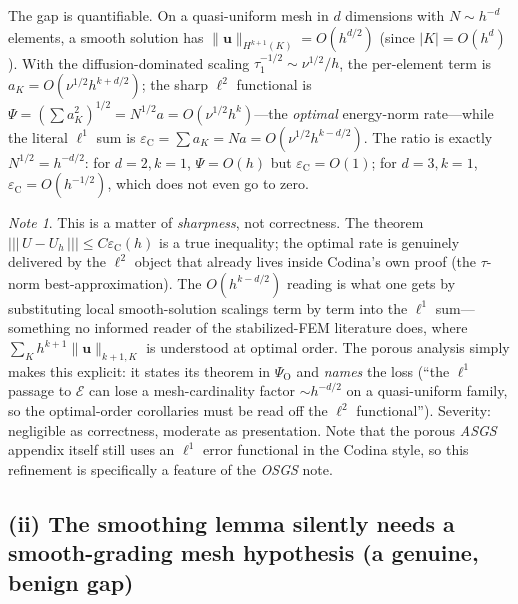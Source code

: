 \documentclass[11pt]{article}
\theoremstyle{remark}
\newtheorem*{note}{Note}
\newcommand{\bu}{\boldsymbol{u}}
\newcommand{\norm}[1]{\lVert #1 \rVert}
\newcommand{\tnorm}[1]{\lvert\!\lvert\!\lvert\, #1 \,\rvert\!\rvert\!\rvert}
\begin{document}
The gap is quantifiable. On a quasi-uniform mesh in $d$ dimensions with $N\sim h^{-d}$
elements, a smooth solution has $\norm{\bu}_{H^{k+1}(K)}=O(h^{d/2})$ (since $|K|=O(h^d)$).
With the diffusion-dominated scaling $\tau_1^{-1/2}\sim\nu^{1/2}/h$, the per-element term is
$a_K=O(\nu^{1/2}h^{k+d/2})$; the sharp $\ell^2$ functional is
$\Psi=(\sum a_K^2)^{1/2}=N^{1/2}a=O(\nu^{1/2}h^{k})$---the \emph{optimal} energy-norm
rate---while the literal $\ell^1$ sum is $\varepsilon_{\mathrm C}=\sum a_K=Na=O(\nu^{1/2}h^{k-d/2})$.
The ratio is exactly $N^{1/2}=h^{-d/2}$: for $d=2,k=1$, $\Psi=O(h)$ but
$\varepsilon_{\mathrm C}=O(1)$; for $d=3,k=1$, $\varepsilon_{\mathrm C}=O(h^{-1/2})$, which
does not even go to zero.

\begin{note}
This is a matter of \emph{sharpness}, not correctness. The theorem
$\tnorm{U-U_h}\le C\varepsilon_{\mathrm C}(h)$ is a true inequality; the optimal rate is
genuinely delivered by the $\ell^2$ object that already lives inside Codina's own proof
(the $\tau$-norm best-approximation). The $O(h^{k-d/2})$ reading is what one gets by
substituting local smooth-solution scalings term by term into the $\ell^1$ sum---something no
informed reader of the stabilized-FEM literature does, where $\sum_K h^{k+1}\norm{\bu}_{k+1,K}$
is understood at optimal order. The porous analysis simply makes this explicit: it states its
theorem in $\Psi_{\mathrm O}$ and \emph{names} the loss (``the $\ell^1$ passage to $\mathcal E$
can lose a mesh-cardinality factor $\sim h^{-d/2}$ on a quasi-uniform family, so the
optimal-order corollaries must be read off the $\ell^2$ functional''). Severity: negligible as
correctness, moderate as presentation. Note that the porous \emph{ASGS} appendix itself still
uses an $\ell^1$ error functional in the Codina style, so this refinement is specifically a
feature of the \emph{OSGS} note.
\end{note}

\subsection*{(ii) The smoothing lemma silently needs a smooth-grading mesh hypothesis (a genuine, benign gap)}
\end{document}
